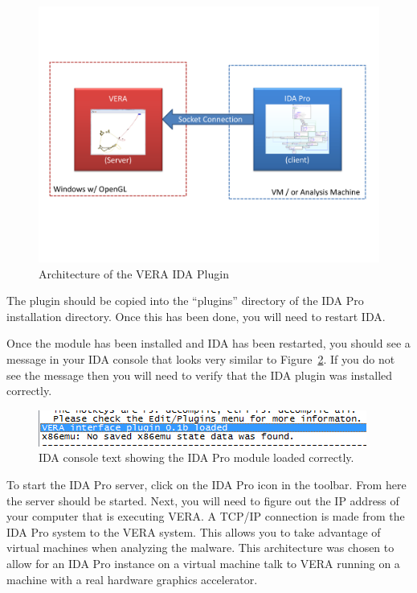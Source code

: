 \documentclass[11pt]{article}
\begin{document}
\begin{figure}[htb]
  \centering
  \includegraphics[width=5.0in]{architecture.pdf}
  \caption{Architecture of the VERA IDA Plugin}\label{fig:vera-ida-arch}
\end{figure}

The plugin should be copied into the ``plugins'' directory of the
IDA Pro installation directory. Once this has been done, you will need
to restart IDA.   

Once the module has been installed and IDA has been restarted, you
should see a message in your IDA console that looks very similar to
Figure~\ref{fig:vera_plugin}. If you do not see the message then you
will need to verify that the IDA plugin was installed correctly. 

\begin{figure}[htb]
  \centering
  \includegraphics{vera-ida-text.png}
  \caption{IDA console text showing the IDA Pro module loaded correctly.}\label{fig:vera_plugin}
\end{figure}

To start the IDA Pro server, click on the IDA Pro icon in the toolbar. From
here the server should be started. Next, you will need to figure out
the IP address of your computer that is executing VERA. A TCP/IP
connection is made from the IDA Pro system to the VERA system. This
allows you to take advantage of virtual machines when analyzing the
malware. This architecture was chosen to allow for an IDA Pro instance
on a virtual machine talk to VERA running on a machine with a real
hardware graphics accelerator. 


\newpage
%
\end{document}
